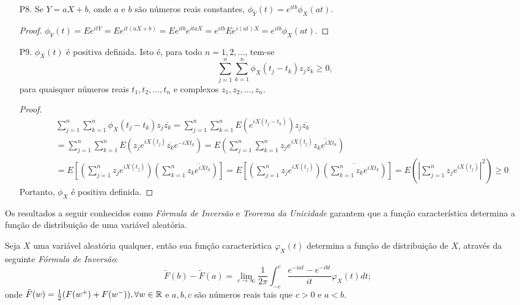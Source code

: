 \begin{frame}
\begin{enumerate}


\item[P8.] Se $Y=aX+b$, onde $a$ e $b$ são números reais constantes,
$\phi_Y(t)=e^{itb}\phi_X(at)$.

\begin{proof} $
\phi_Y(t)=Ee^{itY}=Ee^{it(aX+b)}=Ee^{itb}e^{itaX}=e^{itb}Ee^{i(at)X}=e^{itb}\phi_X(at).$
\end{proof}

\item[P9.] $\phi_X(t)$ é positiva definida. Isto é, para todo $n=1,2,\ldots$, tem-se
$$\sum_{j=1}^{n}\sum_{k=1}^{n}\phi_X(t_j-t_k)z_j\overline{z_k}\geq 0,$$
para quaisquer números reais $t_1,t_2,\ldots,t_n$ e complexos $z_1,z_2,\ldots,z_n$.
\begin{proof}

{\small \begin{eqnarray}
& & \sum_{j=1}^{n}\sum_{k=1}^{n}\phi_X(t_j-t_k)z_j\overline{z_k} = \sum_{j=1}^{n}\sum_{k=1}^{n}E(e^{iX(t_j-t_k)})z_j\overline{z_k} \nonumber \\
& & = \sum_{j=1}^{n}\sum_{k=1}^{n}E(z_je^{iX(t_j)}\overline{z_k}e^{-iXt_k}) = E (\sum_{j=1}^{n}\sum_{k=1}^{n}z_je^{iX(t_j)}\overline{z_k e^{iXt_k}}) \nonumber \\
& & = E [(\sum_{j=1}^{n}z_je^{iX(t_j)})(\sum_{k=1}^{n}\overline{z_ke^{iXt_k}})] = E [(\sum_{j=1}^{n}z_je^{iX(t_j)})(\overline{\sum_{k=1}^{n}z_ke^{iXt_k}})]= E (|\sum_{j=1}^{n}z_je^{iX(t_j)}|^2)\geq 0 \nonumber
\end{eqnarray}}
Portanto, $\phi_X$ é positiva definida.
\end{proof}
\end{enumerate}

\end{frame}

\begin{frame}

Os resultados a seguir conhecidos como {\em Fórmula de Inversão} e {\em Teorema da Unicidade} garantem que a função característica determina a função de distribuição de uma variável aleatória.

\begin{teo} Seja $X$ uma variável aleatória qualquer, então sua função característica $\varphi_X(t)$ determina a função de distribuição de $X$, através da seguinte {\em Fórmula de Inversão}:
$$\tilde{F}(b)-\tilde{F}(a)=\lim_{c\rightarrow\infty}\frac{1}{2\pi}\int_{-c}^{c}\frac{e^{-iat}-e^{-ibt}}{it}\varphi_X(t)dt;$$
onde $\tilde{F}(w)=\frac{1}{2}(F(w^+)+F(w^-)),\forall w\in\mathbb{R}$ e $a,b,c$ são números reais tais que $c>0$ e $a<b$.
\end{teo}

\end{frame}


